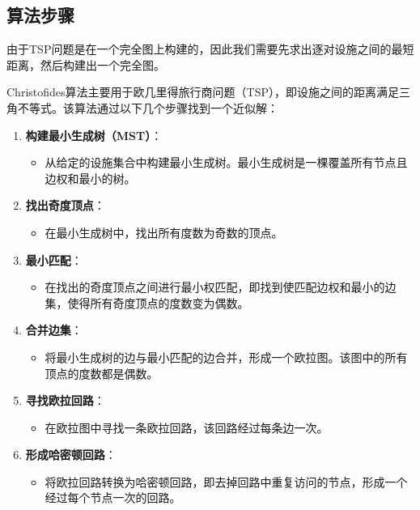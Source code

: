 \documentclass{report}
\begin{document}
\subsection{算法步骤}
由于TSP问题是在一个完全图上构建的，因此我们需要先求出逐对设施之间的最短距离，然后构建出一个完全图。
\par
Christofides算法主要用于欧几里得旅行商问题（TSP），即设施之间的距离满足三角不等式。该算法通过以下几个步骤找到一个近似解：
\begin{enumerate}
    \item \textbf{构建最小生成树（MST）}：
    \begin{itemize}
        \item 从给定的设施集合中构建最小生成树。最小生成树是一棵覆盖所有节点且边权和最小的树。
    \end{itemize}

    \item \textbf{找出奇度顶点}：
    \begin{itemize}
        \item 在最小生成树中，找出所有度数为奇数的顶点。
    \end{itemize}

    \item \textbf{最小匹配}：
    \begin{itemize}
        \item 在找出的奇度顶点之间进行最小权匹配，即找到使匹配边权和最小的边集，使得所有奇度顶点的度数变为偶数。
    \end{itemize}

    \item \textbf{合并边集}：
    \begin{itemize}
        \item 将最小生成树的边与最小匹配的边合并，形成一个欧拉图。该图中的所有顶点的度数都是偶数。
    \end{itemize}

    \item \textbf{寻找欧拉回路}：
    \begin{itemize}
        \item 在欧拉图中寻找一条欧拉回路，该回路经过每条边一次。
    \end{itemize}

    \item \textbf{形成哈密顿回路}：
    \begin{itemize}
        \item 将欧拉回路转换为哈密顿回路，即去掉回路中重复访问的节点，形成一个经过每个节点一次的回路。
    \end{itemize}
\end{enumerate}
\end{document}
